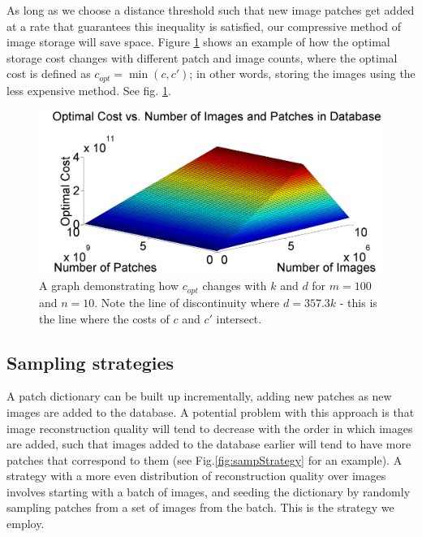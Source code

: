 As long as we choose a distance threshold such that new image patches get added at a rate that guarantees this inequality is satisfied, our compressive method of image storage will save space.  Figure \ref{fig:optcost} shows an example of how the optimal storage cost changes with different patch and image counts, where the optimal cost is defined as $c_{opt} = \min{(c, c')}$; in other words, storing the images using the less expensive method. See fig. \ref{fig:optcost}.

 \begin{figure}
\includegraphics[width=1\linewidth]{Figures/PatchCosts.png}
\caption{A graph demonstrating how $c_{opt}$ changes with $k$ and $d$ for $m=100$ and $n=10$.  Note the line of discontinuity where $d = 357.3 k$ - this is the line where the costs of $c$ and $c'$ intersect.}
\label{fig:optcost}
\end{figure}


\subsection{Sampling strategies}
\label{sec:sample}

A patch dictionary can be built up incrementally, adding new patches as new images are added to the database. A potential problem with this approach is that image reconstruction quality will tend to decrease with the order in which images are added, such that images added to the database earlier will tend to have more patches that correspond to them (see Fig.\ref{fig:sampStrategy} for an example). A strategy with a more even distribution of reconstruction quality over images involves starting with a batch of images, and seeding the dictionary by randomly sampling patches from a set of images from the batch. This is the strategy we employ.

